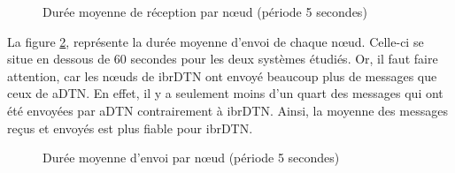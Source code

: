 \documentclass[a4paper,10pt]{article}
\begin{document}
\begin{figure}[h!]
    \centering
    \caption{Durée moyenne de réception par nœud (période 5 secondes)}
    \label{fig:05_avg_rcv_duration}
\end{figure}

La figure \ref{fig:05_avg_snd_duration}, représente la durée moyenne d’envoi de chaque nœud. Celle-ci se situe en dessous de 60 secondes pour les deux systèmes étudiés. Or, il faut faire attention, car les nœuds de ibrDTN ont envoyé beaucoup plus de messages que ceux de aDTN. En effet, il y a seulement moins d’un quart des messages qui ont été envoyées par aDTN contrairement à ibrDTN. Ainsi, la moyenne des messages reçus et envoyés est plus fiable pour ibrDTN.\par

\begin{figure}[h!]
    \centering
    \caption{Durée moyenne d'envoi par nœud (période 5 secondes)}
    \label{fig:05_avg_snd_duration}
\end{figure}
\end{document}

